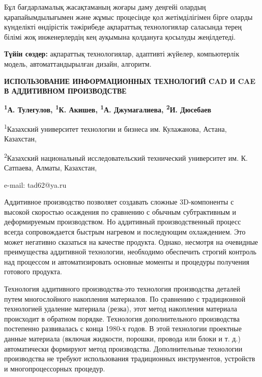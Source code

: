 Бұл бағдарламалық жасақтаманың жоғары даму деңгейі олардың
қарапайымдылығымен және жұмыс процесінде қол жетімділігімен бірге оларды
күнделікті өндірістік тәжірибеде ақпараттық технологиялар саласында
терең білімі жоқ инженерлердің кең ауқымына қолдануға қосылуды
жеңілдетеді.

{\bfseries Түйін сөздер:} ақпараттық технологиялар, адаптивті жүйелер,
компьютерлік модель, автоматтандырылған дизайн, алгоритм.
\vspace{1em}
\begin{articleheader}
{\bfseries ИСПОЛЬЗОВАНИЕ ИНФОРМАЦИОННЫХ ТЕХНОЛОГИЙ CAD И CAE В АДДИТИВНОМ ПРОИЗВОДСТВЕ}

{\bfseries
\textsuperscript{1}А. Тулегулов\textsuperscript{\envelope },
\textsuperscript{1}К. Акишев,
\textsuperscript{1}А. Джумагалиева,
\textsuperscript{2}И. Дюсебаев
}
\end{articleheader}

\begin{affiliation}
\textsuperscript{1}Казахский университет технологии и бизнеса им. Кулажанова, Астана, Казахстан,

\textsuperscript{2}Казахский национальный исследовательский технический университет им. К. Сатпаева, Алматы, Казахстан,

e-mail: tad62@ya.ru
\end{affiliation}

Аддитивное производство позволяет создавать сложные 3D-компоненты с
высокой скоростью осаждения по сравнению с обычным субтрактивным и
деформируемым производством. Но аддитивный производственный процесс
всегда сопровождается быстрым нагревом и последующим охлаждением. Это
может негативно сказаться на качестве продукта. Однако, несмотря на
очевидные преимущества аддитивной технологии, необходимо обеспечить
строгий контроль над процессом и автоматизировать основные моменты и
процедуры получения готового продукта.

Технология аддитивного производства-это технология производства деталей
путем многослойного накопления материалов. По сравнению с традиционной
технологией удаление материала (резка), этот метод накопления материала
происходит в обратном порядке. Технология дополнительного производства
постепенно развивалась с конца 1980-х годов. В этой технологии проектные
данные материала (включая жидкости, порошки, провода или блоки и т. д.)
автоматически формируют метод производства. Дополнительные технологии
производства не требуют использования традиционных инструментов,
устройств и многопроцессорных процедур.

